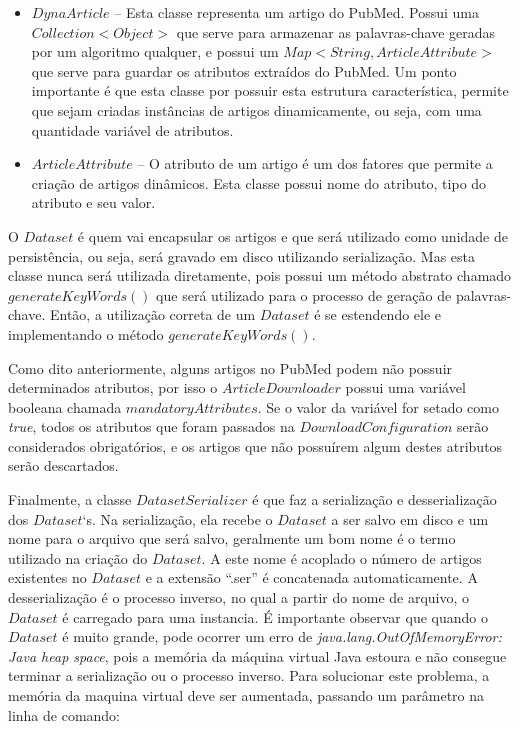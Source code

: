 \begin{itemize}
\item $DynaArticle$ – Esta classe representa um artigo do PubMed. Possui uma
$Collection<Object>$ que serve para armazenar as palavras-chave geradas por um
algoritmo qualquer, e possui um $Map<String, ArticleAttribute>$ que serve para
guardar os atributos extraídos do PubMed. Um ponto importante é que esta classe por
possuir esta estrutura característica, permite que sejam criadas instâncias de artigos
dinamicamente, ou seja, com uma quantidade variável de atributos.

\item $ArticleAttribute$ – O atributo de um artigo é um dos fatores que permite a criação de
artigos dinâmicos. Esta classe possui nome do atributo, tipo do atributo e seu valor.

\end{itemize}
O $Dataset$ é quem vai encapsular os artigos e que será utilizado como unidade de persistência,
ou seja, será gravado em disco utilizando serialização. Mas esta classe nunca será utilizada
diretamente, pois possui um método abstrato chamado $generateKeyWords()$ que será
utilizado para o processo de geração de palavras-chave. Então, a utilização correta de um
$Dataset$ é se estendendo ele e implementando o método $generateKeyWords()$.

Como dito anteriormente, alguns artigos no PubMed podem não possuir determinados atributos, por isso o $ArticleDownloader$ possui uma variável booleana chamada $mandatoryAttributes$. Se o valor da variável for setado como \emph{true}, todos os atributos que foram passados na $DownloadConfiguration$ serão considerados obrigatórios, e os artigos que não possuírem algum destes atributos serão descartados.

Finalmente, a classe $DatasetSerializer$ é que faz a serialização e desserialização dos
$Dataset$`s. Na serialização, ela recebe o $Dataset$ a ser salvo em disco e um nome para o
arquivo que será salvo, geralmente um bom nome é o termo utilizado na criação do $Dataset$. A
este nome é acoplado o número de artigos existentes no $Dataset$ e a extensão “.ser” é
concatenada automaticamente. A desserialização é o processo inverso, no qual a partir do nome
de arquivo, o $Dataset$ é carregado para uma instancia.
É importante observar que quando o $Dataset$ é muito grande, pode ocorrer um erro de
\emph{java.lang.OutOfMemoryError: Java heap space}, pois a memória da máquina virtual Java
estoura e não consegue terminar a serialização ou o processo inverso. Para solucionar este
problema, a memória da maquina virtual deve ser aumentada, passando um parâmetro na linha
de comando:


